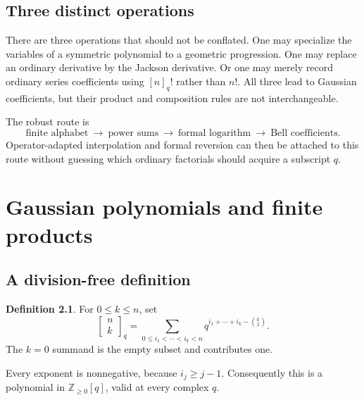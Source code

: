 \documentclass[11pt,a4paper,oneside,openany]{book}
\theoremstyle{definition}
\newtheorem{definition}[theorem]{Definition}
\theoremstyle{remark}
\newcommand{\Z}{\mathbb Z}
\newcommand{\GB}[3][q]{\begin{bmatrix}#2\\#3\end{bmatrix}_{#1}}
\begin{document}
\section{Three distinct operations}
There are three operations that should not be conflated. One may specialize the
variables of a symmetric polynomial to a geometric progression. One may replace
an ordinary derivative by the Jackson derivative. Or one may merely record
ordinary series coefficients using \([n]_q!\) rather than \(n!\). All three lead
to Gaussian coefficients, but their product and composition rules are not
interchangeable.

\begin{masterbox}
The robust route is
\[
 \text{finite alphabet}\ \longrightarrow\ \text{power sums}
 \ \longrightarrow\ \text{formal logarithm}
 \ \longrightarrow\ \text{Bell coefficients}.
\]
Operator-adapted interpolation and formal reversion can then be attached to this
route without guessing which ordinary factorials should acquire a subscript \(q\).
\end{masterbox}

\chapter{Gaussian polynomials and finite products}
\label{qcc:gaussian}
\section{A division-free definition}
\begin{definition}
For \(0\le k\le n\), set
\begin{equation}\label{qcc:subset}
 \GB nk=\sum_{0\le i_1<\cdots<i_k<n}
 q^{i_1+\cdots+i_k-\binom{k}{2}}.
\end{equation}
The \(k=0\) summand is the empty subset and contributes one.
\end{definition}
Every exponent is nonnegative, because \(i_j\ge j-1\). Consequently this is a
polynomial in \(\Z_{\ge0}[q]\), valid at every complex \(q\).
\end{document}
